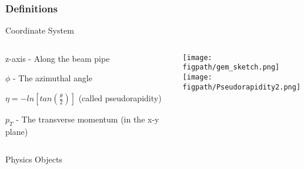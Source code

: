 \begin{frame}%
    \frametitle{Definitions}
    \vspace*{-0.24cm}
    \begin{block}{Coordinate System}
        \begin{columns}[T]
                \begin{itemize}
                    \scriptsize{
                      \item z-axis - Along the beam pipe
                      \item $\phi$ - The azimuthal angle
                      \item $\eta=-ln[tan(\frac{\theta}{2})]$ (called pseudorapidity)
                      \item $p_{T}$ - The transverse momentum (in the x-y plane)
                    }
                \end{itemize}
                \texttt{[image: \\figpath/gem\_sketch.png]}
                \texttt{[image: \\figpath/Pseudorapidity2.png]}
        \end{columns}
    \end{block}
    \vspace*{-0.16cm}
    \begin{block}{Physics Objects}
        \begin{columns}[T]
                \begin{itemize}
                    \scriptsize{
                        }
\end{itemize}
\end{columns}
\end{block}
\end{frame}

